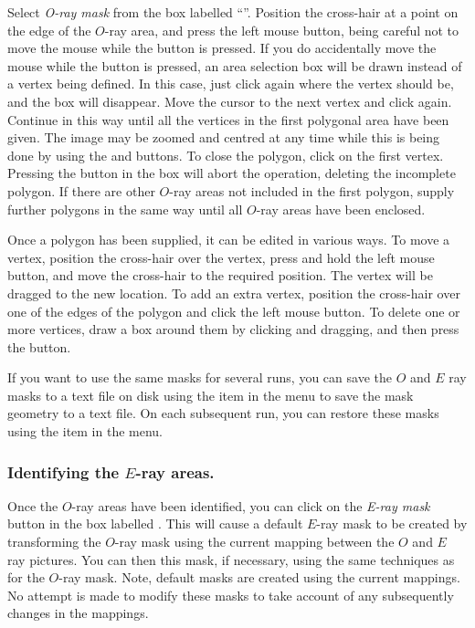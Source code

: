 Select {\em O-ray mask} from the box labelled ``''. Position the cross-hair at a point on the
edge of the $O$-ray area, and press the left mouse button, being careful
not to move the mouse while the button is pressed. If you do accidentally
move the mouse while the button is pressed, an area selection box will be
drawn instead of a vertex being defined. In this case, just click again
where the vertex should be, and the box will disappear. Move the cursor
to the next vertex and click again. Continue in this way until all the
vertices in the first polygonal area have been given. The image may be
zoomed and centred at any time while this is being done by using the
 and 
buttons. To close the polygon, click on the first vertex. Pressing the
 button in the  box will abort the operation,
deleting the incomplete polygon. If there are other $O$-ray areas not
included in the first polygon, supply further polygons in the same way
until all $O$-ray areas have been enclosed.

Once a polygon has been supplied, it can be edited in various ways. To
move a vertex, position the cross-hair over the vertex, press and hold
the left mouse button, and move the cross-hair to the required position.
The vertex will be dragged to the new location. To add an extra vertex,
position the cross-hair over one of the edges of the polygon and click
the left mouse button. To delete one or more vertices, draw a box around 
them by clicking and dragging, and then press the  button.

If you want to use the same masks for several runs, you can save the $O$
and $E$ ray masks to a text file on disk using the
 item in the
 menu to save the mask geometry to
a text file. On each subsequent run, you can restore these masks using the 
 item in the  
menu. 

\subsubsection {Identifying the $E$-ray areas.}
Once the $O$-ray areas have been identified, you can click on the {\em
E-ray mask} button in the box labelled . This will cause a default $E$-ray mask to be
created by transforming the $O$-ray mask using the current mapping
between the $O$ and $E$ ray pictures. You can then
 this mask, if necessary, using the
same techniques as for the $O$-ray mask. Note, default masks are created
using the current mappings. No attempt is made to modify these masks to
take account of any subsequently changes in the mappings.

